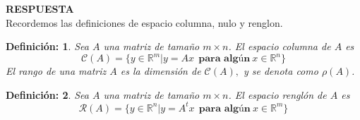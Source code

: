 \documentclass[11pt,letterpaper]{article}
\newcommand{\mR}{\mathbb{R}}
\newcommand{\mcC}{\mathcal{C}}
\newcommand{\res}{\textbf{RESPUESTA}\\}
\newtheorem{thmd}{Definición:}
\begin{document}
\begin{enumerate}
\res Recordemos las definiciones de espacio columna, nulo y renglon.
\begin{framed}
    \begin{thmd} \label{espacio_columna}
    Sea $A$ una matriz de tamaño $m\times n$. El espacio columna de $A$ es 
    $$\mathcal{C}(A)=\{y\in \mR^m|y=Ax\ \ \textbf{para algún}\ x\in\mR^n \}$$
    El rango de una matriz $A$ es la dimensión de $\mcC(A),$ y se denota como $\rho(A)$.
    \end{thmd}
\end{framed} 

\begin{framed}
    \begin{thmd} \label{espacio_renglon}
    Sea $A$ una matriz de tamaño $m\times n$. El espacio renglón de $A$ es 
    $$\mathcal{R}(A)=\{y\in \mR^n|y=A^tx\ \ \textbf{para algún}\ x\in\mR^m \}$$
    \end{thmd}
\end{framed} 


\end{enumerate}
\end{document}

